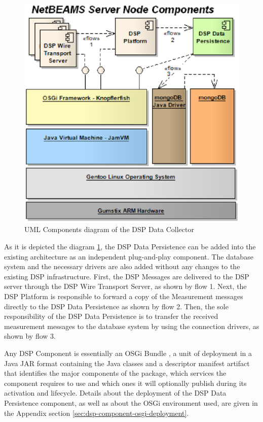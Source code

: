\begin{figure}[!h]
  \centering
  \includegraphics[scale=0.65]{../diagrams/NetBEAMS-Persistence-Server-Node-Components}
  \caption{UML Components diagram of the DSP Data Collector}
  \label{fig:NetBEAMS-Persistence-Server-Node-Components}
\end{figure}

As it is depicted the diagram 
\ref{fig:NetBEAMS-Persistence-Server-Node-Components}, the DSP Data
Persistence can be added into the existing architecture as an 
independent plug-and-play component. The database system and the necessary
drivers are also added without any changes to the existing DSP 
infrastructure. First, the DSP Messages are delivered to the DSP server 
through the DSP Wire Transport Server, as shown by flow 1. Next, the DSP 
Platform is responsible to forward a copy of the Measurement messages 
directly to the DSP Data Persistence as shown by flow 2. Then, the sole 
responsibility of the DSP Data Persistence is to transfer the received 
measurement messages to the database system by using the connection 
drivers, as shown by flow 3.

Any DSP Component is essentially an OSGi Bundle \cite{osgi-intro}, a unit of
deployment in a Java JAR format \cite{java-tutorial} containing the Java
classes and a descriptor manifest artifact that identifies the major components
of the package, which services the component requires to use and which ones it
will optionally publish during its activation and lifecycle. Details about the
deployment of the DSP Data Persistence component, as well as about the OSGi
environment used, are given in the Appendix section
\ref{sec:dsp-component-osgi-deployment}.

